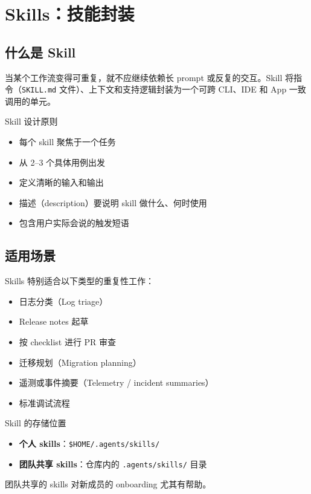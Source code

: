\section{Skills：技能封装}

\subsection{什么是 Skill}

当某个工作流变得可重复，就不应继续依赖长 prompt 或反复的交互。Skill 将指令（\texttt{SKILL.md} 文件）、上下文和支持逻辑封装为一个可跨 CLI、IDE 和 App 一致调用的单元。

\begin{importantbox}{Skill 设计原则}
\begin{itemize}[nosep]
    \item 每个 skill 聚焦于一个任务
    \item 从 2--3 个具体用例出发
    \item 定义清晰的输入和输出
    \item 描述（description）要说明 skill 做什么、何时使用
    \item 包含用户实际会说的触发短语
\end{itemize}
\end{importantbox}

\subsection{适用场景}

Skills 特别适合以下类型的重复性工作：

\begin{itemize}
    \item 日志分类（Log triage）
    \item Release notes 起草
    \item 按 checklist 进行 PR 审查
    \item 迁移规划（Migration planning）
    \item 遥测或事件摘要（Telemetry / incident summaries）
    \item 标准调试流程
\end{itemize}

\begin{knowledgebox}{Skill 的存储位置}
\begin{itemize}[nosep]
    \item \textbf{个人 skills}：\texttt{\$HOME/.agents/skills/}
    \item \textbf{团队共享 skills}：仓库内的 \texttt{.agents/skills/} 目录
\end{itemize}
团队共享的 skills 对新成员的 onboarding 尤其有帮助。
\end{knowledgebox}

